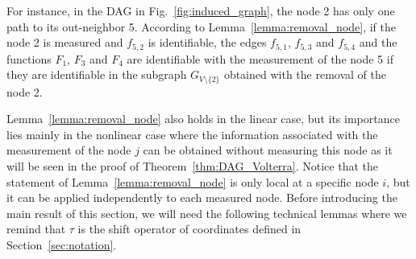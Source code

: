 \documentclass[letterpaper,10pt,journal]{IEEEtran}
\begin{document}
For instance, in the DAG in Fig.~\ref{fig:induced_graph}, the node 2 has only one path to its out-neighbor 5. According to Lemma~\ref{lemma:removal_node}, if the node 2 is measured and $f_{5,2}$ is identifiable, the edges $f_{5,1}$, $f_{5,3}$ and $f_{5,4}$ and the functions $F_1$, $F_3$ and $F_4$ are identifiable with the measurement of the node 5 if they are identifiable in the subgraph $G_{V\setminus \{ 2\}}$ obtained with the removal of the \linebreak node 2.




Lemma~\ref{lemma:removal_node} also holds in the linear case, but its importance lies mainly in the nonlinear case where the information associated with the measurement of the node $j$ can be obtained without measuring this node as it will be seen in the proof of Theorem~\ref{thm:DAG_Volterra}. Notice that the statement of Lemma~\ref{lemma:removal_node} is only local at a specific node $i$, but it can be  applied independently to each measured node.
Before introducing the main result of this section, we will need the following technical lemmas where we remind that $\tau$ is the shift operator of coordinates defined in Section~\ref{sec:notation}.
\end{document}

